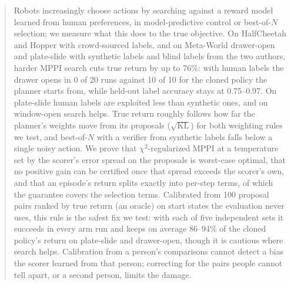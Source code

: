 \documentclass{article}
\theoremstyle{plain}
\theoremstyle{remark}
\newcommand{\KL}{\mathrm{KL}}
\begin{document}

\printAffiliationsAndNotice{\icmlEqualContribution}

\begin{abstract}
Robots increasingly choose actions by searching against a reward model learned from human preferences, in
model-predictive control or best-of-$N$ selection; we measure what this does to the true objective. On
HalfCheetah and Hopper with crowd-sourced labels, and on Meta-World drawer-open and plate-slide with synthetic labels
and blind labels from the two authors, harder MPPI search cuts true return by up to 76\%: with human labels the drawer opens in 0 of 20
runs against 10 of 10 for the cloned policy the planner starts from, while held-out label accuracy stays at
0.75--0.97. On plate-slide human labels are exploited less than synthetic ones, and on window-open search helps. True return roughly follows how far the planner's weights move from
its proposals ($\sqrt{\KL}$) for both weighting rules we test, and best-of-$N$ with a verifier from synthetic labels
falls below a single noisy action. We prove that $\chi^2$-regularized MPPI at a temperature set by the scorer's error spread on the
proposals is worst-case optimal, that no positive gain can be certified once that spread exceeds the scorer's own, and
that an episode's return splits exactly into per-step terms, of which the guarantee covers the selection terms.
Calibrated from 100 proposal pairs ranked by true return (an oracle) on start states the evaluation never uses, this
rule is the safest fix we test: with each of five independent sets it succeeds in every arm run and keeps on average 86--94\% of
the cloned policy's return on plate-slide and drawer-open, though it is cautious where search helps.
Calibration from a person's comparisons cannot detect a bias the scorer learned from that person; correcting for the
pairs people cannot tell apart, or a second person, limits the damage.
\end{abstract}
\end{document}
